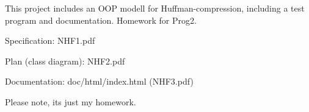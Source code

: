 This project includes an O\+OP modell for Huffman-\/compression, including a test program and documentation. Homework for Prog2.


\begin{DoxyItemize}
\item Specification\+: N\+H\+F1.\+pdf
\item Plan (class diagram)\+: N\+H\+F2.\+pdf
\item Documentation\+: doc/html/index.\+html (N\+H\+F3.\+pdf)
\end{DoxyItemize}

Please note, it\textquotesingle{}s just my homework. 